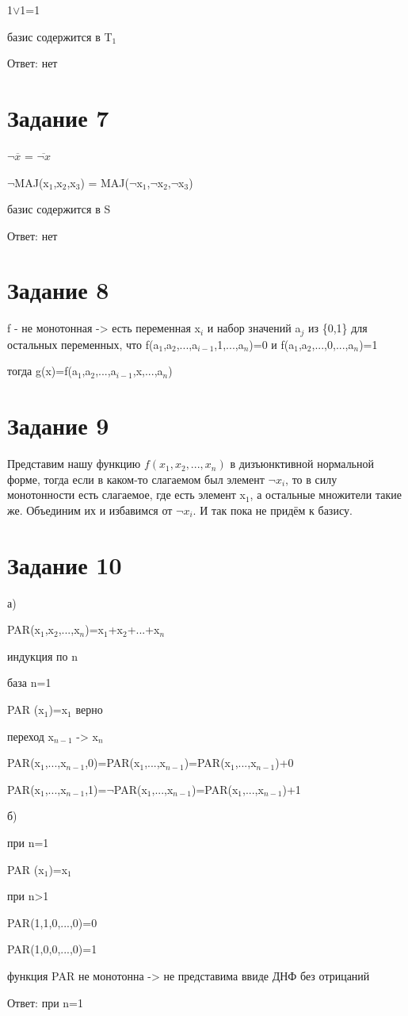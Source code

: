 \documentclass[a4paper, 12pt]{article}
\newcommand{\dor}{$\lor$}
\newcommand{\dnot}{$\neg$}
\begin{document}
		1\dor1=1

		базис содержится в T$_1$

		Ответ: нет
	\section*{Задание 7}
		$\lnot \overline{x}$ = $\overline{\lnot x}$
		
		\dnot MAJ(x$_1$,x$_2$,x$_3$) = MAJ(\dnot x$_1$,\dnot x$_2$,\dnot x$_3$)

		базис содержится в S

		Ответ: нет
	\section*{Задание 8}
		f - не монотонная -> есть переменная x$_i$ и набор значений a$_j$ из \{0,1\} для остальных переменных, что f(a$_1$,a$_2$,...,a$_{i-1}$,1,...,a$_n$)=0 и f(a$_1$,a$_2$,...,0,...,a$_n$)=1

		тогда g(x)=f(a$_1$,a$_2$,...,a$_{i-1}$,x,...,a$_n$)
	\section*{Задание 9}
		Представим нашу функцию $f(x_1, x_2, ..., x_n)$ в дизъюнктивной нормальной форме, тогда если в каком-то слагаемом был элемент $\neg x_i$, то в силу монотонности есть слагаемое, где есть элемент x$_1$, а остальные множители такие же. Объединим их и избавимся от $\neg x_i$. И так пока не придём к базису.
	\section*{Задание 10}
		а)

		PAR(x$_1$,x$_2$,...,x$_n$)=x$_1$+x$_2$+...+x$_n$

		индукция по n

		база n=1

		PAR (x$_1$)=x$_1$ верно

		переход x$_{n-1}$ -> x$_n$

		PAR(x$_1$,...,x$_{n-1}$,0)=PAR(x$_1$,...,x$_{n-1}$)=PAR(x$_1$,...,x$_{n-1}$)+0

		PAR(x$_1$,...,x$_{n-1}$,1)=\dnot PAR(x$_1$,...,x$_{n-1}$)=PAR(x$_1$,...,x$_{n-1}$)+1

		б)

		при  n=1

		PAR (x$_1$)=x$_1$

		при n>1

		PAR(1,1,0,...,0)=0

		PAR(1,0,0,...,0)=1

		функция PAR не монотонна -> не представима ввиде ДНФ без отрицаний

		Ответ: при n=1
\end{document}
